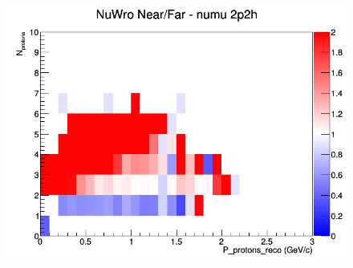 \begin{figure}[h]
\endminipage
{}
\includegraphics[width=\linewidth]{eff_N_P/GAr/protons/ratios/2p2h_NuWro_numu_NF_N_P.png}
\endminipage
\newline
\end{figure}
\clearpage
